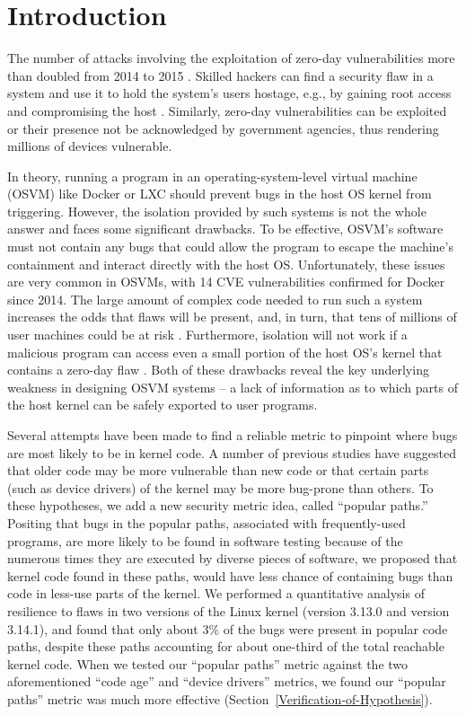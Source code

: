 \section{Introduction}
\label{sec.introduction}

The number of attacks involving the exploitation of zero-day vulnerabilities more than doubled 
from 2014 to 2015 \cite{zero-day}. Skilled hackers can find a security flaw in a system and use it to hold the system's users hostage, e.g., 
by gaining root access and compromising the host \cite{linux-0day}. Similarly, zero-day
vulnerabilities can be exploited \cite{fbi-0day} or their presence not be acknowledged \cite{nsa-0day} 
by government agencies, thus rendering millions of devices vulnerable.

In theory, running a program in an operating-system-level virtual machine (OSVM) like Docker \cite{Docker} or LXC \cite{LXC} should
prevent bugs in the host OS kernel from triggering. 
However, the isolation provided by such systems is not the whole answer and faces some significant drawbacks. 
To be effective, OSVM's software must not contain any bugs that could allow the program to escape the machine's containment 
and interact directly with the host OS. 
Unfortunately, these issues are very common in OSVMs, with 14 CVE vulnerabilities confirmed for Docker \cite{Docker-Vulnerabilities} since 2014. 
The large amount of complex code needed to run such a system increases the odds that flaws will be present, and, in turn, 
that tens of millions of user machines could be at risk \cite{linux-0day}.
Furthermore, isolation will not work if a malicious program can access even a small portion of the host OS's kernel 
that contains a zero-day flaw \cite{CVE-2016-5195}. 
Both of these drawbacks reveal the key underlying weakness in designing OSVM systems -- a lack of information 
as to which parts of the host kernel can be safely exported to user programs. 

Several attempts have been made to find a reliable metric to pinpoint where bugs are most likely to be in kernel code. 
A number of previous studies have suggested that older code may be more vulnerable than new code \cite{ozment2006milk}  
or that certain parts (such as device drivers) of the kernel \cite{PittSFIeld} may be more bug-prone than others. 
To these hypotheses, we add a new security metric idea, called ``popular paths.'' 
Positing that bugs in the popular paths, associated with frequently-used programs, are more likely to be found in software testing 
because of the numerous times they are executed by diverse pieces of software, we proposed that kernel code found in these paths, 
would have less chance of containing bugs than code in less-use parts of the kernel. 
We performed a quantitative analysis of resilience to flaws in two versions of the Linux kernel (version 3.13.0 and version 3.14.1), 
and found that only about 3\% of the bugs were present in popular code paths, 
despite these paths accounting for about one-third of the total reachable kernel code. 
When we tested our ``popular paths'' metric against the two aforementioned ``code age'' and ``device drivers'' metrics, 
we found our ``popular paths'' metric was much more effective (Section~{\ref{Verification-of-Hypothesis}}). 

